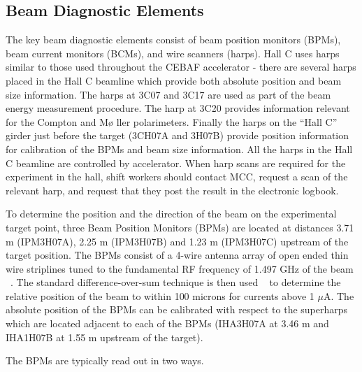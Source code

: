 \subsection{Beam Diagnostic Elements}

The key beam diagnostic elements consist of beam position monitors
(BPMs), beam current monitors (BCMs), and wire scanners (harps). Hall
C uses harps similar to those used throughout the CEBAF accelerator -
there are several harps placed in the Hall C beamline which provide
both absolute position and beam size information.  The harps at 3C07
and 3C17 are used as part of the beam energy measurement procedure.
The harp at 3C20 provides information relevant for the Compton and M\o
ller polarimeters. Finally the harps on the ``Hall C'' girder just
before the target (3CH07A and 3H07B) provide position information for
calibration of the BPMs and beam size information. All the harps in
the Hall C beamline are controlled by accelerator. When harp scans are
required for the experiment in the hall, shift workers should contact
MCC, request a scan of the relevant harp, and request that they post
the result in the electronic logbook.

To determine the position and the direction of the beam on the
experimental target point, three Beam Position Monitors (BPMs) are
located at distances 3.71 m (IPM3H07A), 2.25 m (IPM3H07B) and 1.23 m
(IPM3H07C) upstream of the target position.  The BPMs consist of a
4-wire antenna array of open ended thin wire striplines tuned to the
fundamental RF frequency of 1.497 GHz of the beam
~\cite{bi:bar90}. The standard difference-over-sum technique is then
used ~\cite{bi:HW} to determine the relative position of the beam to
within 100 microns for currents above 1 $\mu $A. The absolute position
of the BPMs can be calibrated with respect to the superharps which are
located adjacent to each of the BPMs (IHA3H07A at 3.46 m and IHA1H07B
at 1.55 m upstream of the target).

The BPMs are typically read out in two ways.

